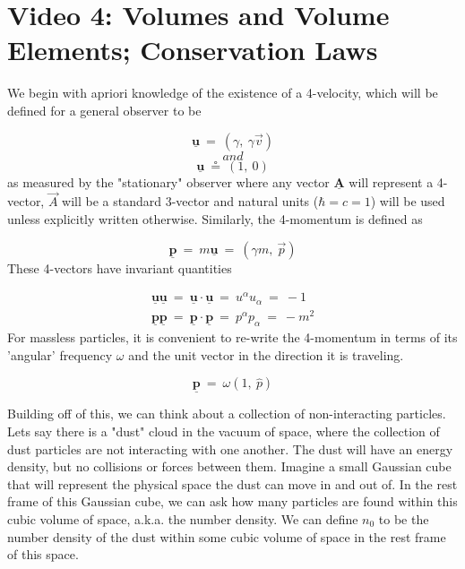 \section*{Video 4: Volumes and Volume Elements; Conservation Laws}
\hskip 25pt We begin with apriori knowledge of the existence of a 4-velocity, which will be defined for a general observer
to be

\begin{equation}
  \underline{\mathbf{u}}\ =\ \left (\gamma,\ \gamma\vec{v}\right )
\end{equation}
$$\mathit{and}$$
\begin{equation}
  \underline{\mathbf{u}}\ \circeq\ \left (1,\ 0\right )
\end{equation}
as measured by the "stationary" observer where any vector $\underline{\mathbf{A}}$ will represent a 4-vector, $\vec{A}$ will be a standard 3-vector and natural units ($\hbar=c=1$) will be used unless explicitly written otherwise.  Similarly, the 4-momentum is defined as

\begin{equation}
  \underline{\mathbf{p}}\ =\ m\underline{\mathbf{u}}\ =\ \left (\gamma m,\ \vec{p}\right )
\end{equation}
These 4-vectors have invariant quantities

\begin{equation}
  \begin{gathered}
    \underline{\mathbf{u}}\underline{\mathbf{u}}\ =\ \underline{\mathbf{u}}\cdot\underline{\mathbf{u}}\
    =\ u^{\alpha}u_{\alpha}\ =\ -1 \\
    \underline{\mathbf{p}}\underline{\mathbf{p}}\ =\ \underline{\mathbf{p}}\cdot\underline{\mathbf{p}}\
    =\ p^{\alpha}p_{\alpha}\ =\ -m^2
  \end{gathered}
\end{equation}
For massless particles, it is convenient to re-write the 4-momentum in terms of its 'angular' frequency $\omega$ and the unit vector in the direction it is traveling.

\begin{equation}
  \underline{\mathbf{p}}\ =\ \omega\left (1,\ \hat{p}\right )
\end{equation}

\hskip 25pt Building off of this, we can think about a collection of non-interacting particles.  Lets say there is a "dust" cloud in the vacuum of space, where the collection of dust particles are not interacting with one another.  The dust will have an energy density, but no collisions or forces between them.  Imagine a small Gaussian cube that will represent the physical space the dust can move in and out of.  In the rest frame of this Gaussian cube, we can ask how many particles are found within this cubic volume of space, a.k.a. the number density.  We can define $n_0$ to be the number density of the dust within some cubic volume of space in the rest frame of this space.

